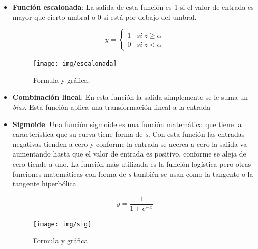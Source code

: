 \documentclass[12pt,a4paper]{article}
\begin{document}
\begin{itemize}
\item \textbf{Función escalonada}: La salida de esta función es 1 si el valor de entrada es mayor que cierto umbral o 0 si está por debajo del umbral.

\begin{figure}[H]
\centering\begin{minipage}[H]{0.5\textwidth}
\large
\begin{equation*}
y = \begin{cases}
1 & si \: z \geq \alpha \\
0 & si \: z < \alpha
\end{cases}
\end{equation*}
\end{minipage}%
\begin{minipage}[t]{0.5\textwidth}
\texttt{[image: img/escalonada]}
\end{minipage}
\caption{Formula y gráfica.}
\end{figure}

\item \textbf{Combinación lineal}: En esta función la salida simplemente se le suma un \textit{bias}. Esta función aplica una transformación lineal a la entrada

\item \textbf{Sigmoide}: Una función sigmoide es una función matemática que tiene la característica que su curva tiene forma de \textit{s}. Con esta función las entradas negativas tienden a cero y conforme la entrada se acerca a cero la salida va aumentando hasta que el valor de entrada es positivo, conforme se aleja de cero tiende a uno. La función más utilizada es la función logística pero otras funciones matemáticas con forma de \textit{s} también se usan como la tangente o la tangente hiperbólica.

\begin{figure}[H]
\centering\begin{minipage}[H]{0.5\textwidth}
\large
\begin{equation*}
y = \frac{1}{1+e^{-x}}
\end{equation*}
\end{minipage}%
\begin{minipage}[t]{0.5\textwidth}
\texttt{[image: img/sig]}
\end{minipage}
\caption{Formula y gráfica.}
\end{figure}


\end{itemize}
\end{document}
